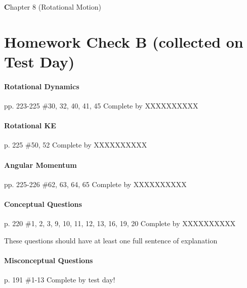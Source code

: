 \documentclass[10pt]{exam}
\def\mytitle{Chapter 8 (Rotational Motion)}
\def\mymaketitle{
  \begin{flushleft}
    {\LARGE \textbf \mytitle \par}
  \end{flushleft}
}
\begin{document}
\vspace{1em}




\pagebreak

\mymaketitle

\section*{Homework Check B (collected on Test Day)}



\paragraph{Rotational Dynamics} pp. 223-225 \#30, 32, 40, 41, 45
\dotfill Complete by XXXXXXXXXX






\paragraph{Rotational KE} p. 225 \#50, 52
\dotfill Complete by XXXXXXXXXX





\paragraph{Angular Momentum} pp. 225-226 \#62, 63, 64, 65
\dotfill Complete by XXXXXXXXXX





\paragraph{Conceptual Questions} p. 220 \#1, 2, 3, 9, 10, 11, 12, 13, 16, 19, 20
\dotfill Complete by XXXXXXXXXX
   
{\sc These questions should have at least one full sentence 
      of explanation}



\paragraph{Misconceptual Questions} p. 191 \#1-13
\dotfill Complete by test day!
   
\end{document}
